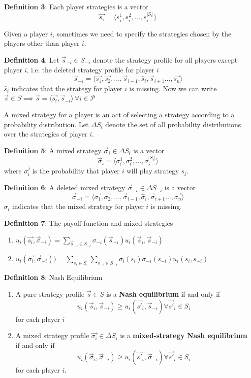 \documentclass[conference]{IEEEtran}
\begin{document}
\textbf{Definition 3}: Each player strategies is a vector $$\vec{s_i} = \langle s_i^1, s_i^2, \ldots, s_i^{|S_i|}\rangle$$ 
\par Given a player $i$, sometimes we need to specify the strategies chosen by the players other than player $i$. 

\textbf{Definition 4}: Let $\vec{s}_{-i} \in S_{-i}$ denote the strategy profile for all players except player $i$, i.e. the deleted strategy profile for player $i$
$$\vec{s}_{-i} = \langle \vec{s_1}, \vec{s_2}, \ldots, \vec{s}_{i-1}, \hat{s}_{i}, \vec{s}_{i+1} \ldots, \vec{s_n}\rangle$$ $\hat{s}_{i}$ indicates that the strategy for player $i$ is missing.
Now we can write $\vec{s} \in S \implies \vec{s} = \langle \vec{s_i}, \vec{s}_{-i} \rangle \, \forall i \in \mathcal{P} $

\par A mixed strategy for a player is an act of selecting a strategy according to a probability distribution. Let $\Delta S_i$ denote the set of all probability distributions over the strategies of player $i$.

\textbf{Definition 5}: A mixed strategy $\vec{\sigma}_i \in \Delta S_i$ is a vector $$\vec{\sigma}_i = \langle\sigma_i^1, \sigma_i^2, \ldots, \sigma_i^{|S_i|}\rangle$$ where $\sigma_i^j$ is the probability that player $i$ will play strategy $s_j$.

\textbf{Definition 6}: A deleted mixed strategy $\vec{\sigma}_{-i} \in \Delta S_{-i}$ is a vector $$\vec{\sigma}_{-i} = \langle \vec{\sigma_1}, \vec{\sigma_2}, \ldots, \vec{\sigma}_{i-1}, \hat{\sigma}_{i}, \vec{\sigma}_{i+1} \ldots, \vec{\sigma_n}\rangle$$ $\hat{\sigma}_{i}$ indicates that the mixed strategy for player $i$ is missing.

\textbf{Definition 7}: The payoff function and mixed strategies
\begin{enumerate}
\item $u_i(\vec{s_i}, \vec{\sigma}_{-i}) = \displaystyle\sum_{\vec{s}_{-i} \in S_{-i}}\sigma_{-i}(\vec{s}_{-i})u_i(\vec{s}_i, \vec{s}_{-i})$
\item $u_i(\vec{\sigma_i}, \vec{\sigma}_{-i})) = \displaystyle\sum_{s_i \in S_i}\sum_{s_{-i} \in S_{-i}}\sigma_i(s_i)\sigma_{-i}(s_{-i})u_i(s_i, s_{-i})$
\end{enumerate}
\textbf{Definition 8}: Nash Equilibrium
\begin{enumerate}

\item A pure strategy profile $\vec{s} \in S$ is a \textbf{Nash equilibrium} if and only if $$u_i(\vec{s}_i, \vec{s}_{-i}) \geq u_i(\vec{s'}_i, \vec{s}_{-i}) \forall{\vec{s'}_i \in S_i}$$ for each player $i$
\item A mixed strategy profile $\vec{\sigma_i} \in \Delta S_i$ is a \textbf{mixed-strategy Nash equilibrium} if and only if $$u_i(\vec{\sigma}_i, \vec{\sigma}_{-i}) \geq u_i(\vec{s'}_i, \vec{\sigma}_{-i}) \forall{\vec{s'}_i \in S_i}$$ for each player $i$.

\end{enumerate}
\end{document}
